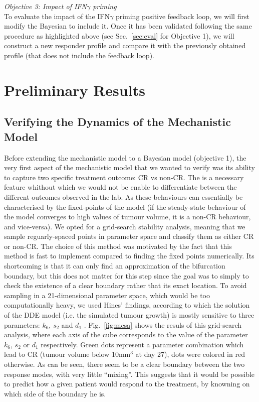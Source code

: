 \documentclass[11pt]{article}
\begin{document}
\textit{Objective 3: Impact of IFN$\gamma$ priming}\\[3pt]
To evaluate the impact of the IFN$\gamma$ priming positive feedback loop, we will first modify the Bayesian to include it. Once it has been validated following the same procedure as highlighted above (see Sec.~\ref{sec:eval} for Objective 1), we will construct a new responder profile and compare it with the previously obtained profile (that does not include the feedback loop).

\section{Preliminary Results}

\subsection{Verifying the Dynamics of the Mechanistic Model}\label{sec:montecarloSA}

Before extending the mechanistic model to a Bayesian model (objective 1), the very first aspect of the mechanistic model that we wanted to verify was its ability to capture two specific treatment outcome: CR vs non-CR. The is a necessary feature whithout which we would not be enable to differentiate between the different outcomes observed in the lab. As these behaviours can essentially be characterised by the fixed-points of the model (if the steady-state behaviour of the model converges to high values of tumour volume, it is a non-CR behaviour, and vice-versa). We opted for a grid-search stability analysis, meaning that we sample reguarly-spaced points in parameter space and classify them as either CR or non-CR. The choice of this method was motivated by the fact that this method is fast to implement compared to finding the fixed points numerically. Its shortcoming is that it can only find an approximation of the bifurcation boundary, but this does not matter for this step since the goal was to simply to check the existence of a clear boundary rather that its exact location. To avoid sampling in a 21-dimensional parameter space, which would be too computationally heavy, we used Hines' findings, according to which the solution of the DDE model (i.e. the simulated tumour growth) is mostly sensitive to three parameters: $k_6$, $s_2$ and $d_1$ \cite{christian1}. Fig.~\ref{fig:mcsa} shows the resuls of this grid-search analysis, where each axis of the cube corresponds to the value of the parameter $k_6$, $s_2$ or $d_1$ respectively. Green dots represent a parameter combination which lead to CR (tumour volume below 10mm$^3$ at day 27), dots were colored in red otherwise. As can be seen, there seem to be a clear boundary between the two response modes, with very little ``mixing''. This suggests that it would be possible to predict how a given patient would respond to the treatment, by knowning on which side of the boundary he is.
\end{document}
